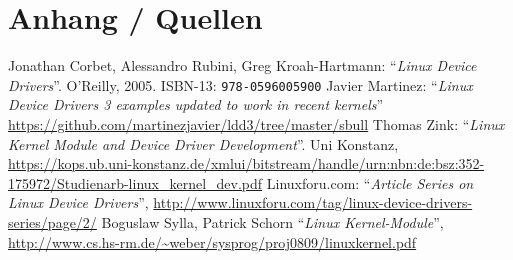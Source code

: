 \section{Anhang / Quellen}


\begin{thebibliography}{1}
    Jonathan Corbet, Alessandro Rubini, Greg Kroah-Hartmann:
       \enquote{\sl Linux Device Drivers}. O'Reilly, 2005. ISBN-13: \texttt{978-0596005900}
     Javier Martinez: \enquote{\sl Linux Device Drivers 3 examples updated to work in recent kernels} \url{https://github.com/martinezjavier/ldd3/tree/master/sbull}
    Thomas Zink: \enquote{\sl Linux Kernel Module and Device Driver Development}. Uni Konstanz, \url{https://kops.ub.uni-konstanz.de/xmlui/bitstream/handle/urn:nbn:de:bsz:352-175972/Studienarb-linux_kernel_dev.pdf}
     Linuxforu.com: \enquote{\sl Article Series on Linux Device Drivers}, \url{http://www.linuxforu.com/tag/linux-device-drivers-series/page/2/}
     Boguslaw Sylla, Patrick Schorn \enquote{\sl Linux Kernel-Module}, \url{http://www.cs.hs-rm.de/~weber/sysprog/proj0809/linuxkernel.pdf}
\end{thebibliography}